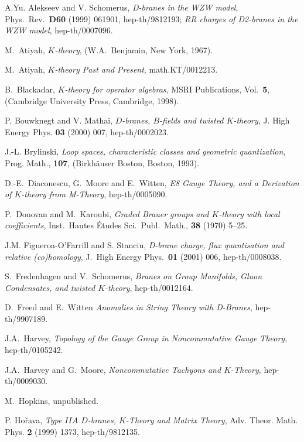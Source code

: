 \documentclass[a4paper,reqno]{amsart}
\theoremstyle{plain}
\theoremstyle{definition}
\theoremstyle{remark}
\numberwithin{equation}{section}
\numberwithin{figure}{section}
\newcommand{\<}{\langle}
\renewcommand{\>}{\rangle}
\begin{document}
\begin{thebibliography}{99}

A.Yu. Alekseev and V. Schomerus, {\it D-branes in the WZW model},
Phys.\ Rev.\ {\bf D60} (1999) 061901, hep-th/9812193;
{\it RR charges of D2-branes in the WZW model}, hep-th/0007096.

M.~Atiyah, {\it $K$-theory},
(W.A.~Benjamin, New York, 1967).

M.~Atiyah, {\it $K$-theory Past and Present},
math.KT/0012213.

B.~Blackadar,
{\it $K$-theory for operator algebras},
MSRI Publications, Vol.\ {\bf 5},
(Cambridge University Press, Cambridge, 1998).

P. Bouwknegt and V. Mathai,
{\it $D$-branes, $B$-fields and twisted $K$-theory},
J. High Energy Phys. {\bf 03} (2000) 007, hep-th/0002023.

J.-L. Brylinski, {\it Loop spaces, characteristic classes and
geometric quantization},
Prog. Math., {\bf 107}, (Birkh\"auser Boston, Boston, 1993).

D.-E.~Diaconescu, G.~Moore and E.~Witten,
{\it E8 Gauge Theory, and a Derivation of $K$-theory from M-Theory},
hep-th/0005090.


 P.~Donovan and M.~Karoubi, {\em Graded Brauer
groups and $K$-theory with local coefficients}, Inst.\ Hautes
\'Etudes Sci.\ Publ.\ Math., {\bf 38} (1970) 5--25.


J.M. Figueroa-O'Farrill and S. Stanciu,
{\it D-brane charge, flux quantisation and relative (co)homology},
J.\ High Energy Phys.\ {\bf 01} (2001) 006, hep-th/0008038.

S.~Fredenhagen and V.~Schomerus,
{\it Branes on Group Manifolds, Gluon Condensates, and twisted $K$-theory},
hep-th/0012164.

D.~Freed and E.~Witten
{\it Anomalies in String Theory with D-Branes}, hep-th/9907189.

J.A.~Harvey,
{\it Topology of the Gauge Group in Noncommutative Gauge Theory},
hep-th/0105242.

J.A.~Harvey and G.~Moore,
{\it Noncommutative Tachyons and $K$-Theory}, hep-th/0009030.

M.~Hopkins, unpublished.

P. Ho\v rava, {\it Type $IIA$ $D$-branes, $K$-Theory and Matrix Theory},
Adv. Theor. Math. Phys. {\bf 2} (1999) 1373, hep-th/9812135.


\end{thebibliography}
\end{document}
